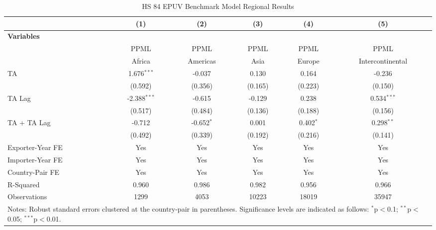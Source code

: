 \begin{table}[htbp]
    \centering
    \caption{HS 84 EPUV Benchmark Model Regional Results}
    \label{tab:84_benchmark_region_analysis} %
    \begin{adjustbox}{max width=\textwidth}
    \begin{tabular}{l@{\extracolsep{1pt}}ccccc}
    \hline
    & \multicolumn{1}{c}{(1)} & \multicolumn{1}{c}{(2)} & \multicolumn{1}{c}{(3)} & \multicolumn{1}{c}{(4)} & \multicolumn{1}{c}{(5)} \\
    \hline
    \textbf{Variables} &  &  &  &  &  \\
    \hline
     & PPML & PPML & PPML & PPML & PPML \\
     & Africa & Americas & Asia & Europe & Intercontinental \\
    \hline
    TA & 1.676$^{\ast\ast\ast}$ & -0.037 & 0.130 & 0.164 & -0.236 \\
    & (0.592) & (0.356) & (0.165) & (0.223) & (0.150) \\

    TA Lag & -2.388$^{\ast\ast\ast}$ & -0.615 & -0.129 & 0.238 & 0.534$^{\ast\ast\ast}$ \\
    & (0.517) & (0.484) & (0.136) & (0.188) & (0.156) \\

    TA + TA Lag & -0.712 & -0.652$^{\ast}$ & 0.001 & 0.402$^{\ast}$ & 0.298$^{\ast\ast}$ \\
    & (0.492) & (0.339) & (0.192) & (0.216) & (0.141) \\
    \hline
    Exporter-Year FE & Yes & Yes & Yes & Yes & Yes \\
    Importer-Year FE & Yes & Yes & Yes & Yes & Yes \\
    Country-Pair FE & Yes & Yes & Yes & Yes & Yes \\
    R-Squared & 0.960 & 0.986 & 0.982 & 0.956 & 0.966 \\
    Observations & 1299 & 4053 & 10223 & 18019 & 35947 \\
    \hline
    \multicolumn{6}{l}{\footnotesize{Notes: Robust standard errors clustered at the country-pair in parentheses. Significance levels are indicated as follows: $^{\ast}$p$<$0.1; $^{\ast\ast}$p$<$0.05; $^{\ast\ast\ast}$p$<$0.01.}} \\
    \end{tabular}
    \end{adjustbox}
\end{table}
